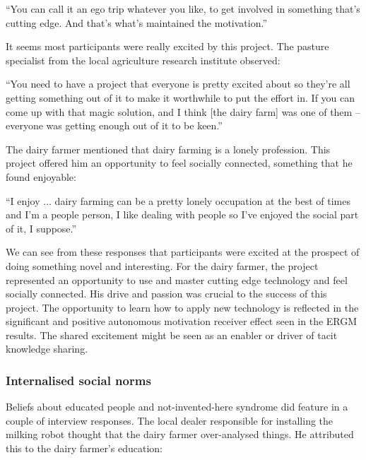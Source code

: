\begin{displayquote}[Participant 15/2]
\small
\enquote{You can call it an ego trip whatever you like, to get involved in something that's cutting edge. And that's what's maintained the motivation.} 
\end{displayquote}


It seems most participants were really excited by this project. The pasture specialist from the local agriculture research institute observed:

\begin{displayquote}[Participant 11/2]
\small
\enquote{You need to have a project that everyone is pretty excited about so they're all getting something out of it to make it worthwhile to put the effort in. If you can come up with that magic solution, and I think [the dairy farm] was one of them -- everyone was getting enough out of it to be keen.} 
\end{displayquote}


The dairy farmer mentioned that dairy farming is a lonely profession. This project offered him an opportunity to feel socially connected, something that he found enjoyable:

\begin{displayquote}[Participant 1/2]
\small
\enquote{I enjoy ... dairy farming can be a pretty lonely occupation at the best of times and I'm a people person, I like dealing with people so I've enjoyed the social part of it, I suppose.} 

\end{displayquote}


We can see from these responses that participants were excited at the prospect of doing something novel and interesting. For the dairy farmer, the project represented an opportunity to use and master cutting edge technology and feel socially connected. His drive and passion was crucial to the success of this project. The opportunity to learn how to apply new technology is reflected in the significant and positive autonomous motivation receiver effect seen in the ERGM results. The shared excitement might be seen as an enabler or driver of tacit knowledge sharing.

\subsubsection{Internalised social norms}

Beliefs about educated people and not-invented-here syndrome did feature in a couple of interview responses. The local dealer responsible for installing the milking robot thought that the dairy farmer over-analysed things. He attributed this to the dairy farmer's education:

